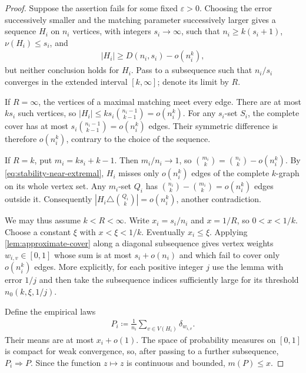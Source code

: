 \begin{proof}
Suppose the assertion fails for some fixed $\varepsilon>0$. Choosing the error successively smaller and the matching parameter successively larger gives a sequence $H_i$ on $n_i$ vertices, with integers $s_i\to\infty$, such that $n_i\ge k(s_i+1)$, $\nu(H_i)\le s_i$, and
\begin{align}
|H_i|\ge D(n_i,s_i)-o(n_i^k),
\label{eq:stability-near-extremal}
\end{align}
but neither conclusion holds for $H_i$. Pass to a subsequence such that $n_i/s_i$ converges in the extended interval $[k,\infty]$; denote its limit by $R$.

If $R=\infty$, the vertices of a maximal matching meet every edge. There are at most $ks_i$ such vertices, so $|H_i|\le ks_i\binom{n_i-1}{k-1}=o(n_i^k)$. For any $s_i$-set $S_i$, the complete cover has at most $s_i\binom{n_i-1}{k-1}=o(n_i^k)$ edges. Their symmetric difference is therefore $o(n_i^k)$, contrary to the choice of the sequence.

If $R=k$, put $m_i=ks_i+k-1$. Then $m_i/n_i\to1$, so $\binom{m_i}k=\binom{n_i}k-o(n_i^k)$. By \cref{eq:stability-near-extremal}, $H_i$ misses only $o(n_i^k)$ edges of the complete $k$-graph on its whole vertex set. Any $m_i$-set $Q_i$ has $\binom{n_i}k-\binom{m_i}k=o(n_i^k)$ edges outside it. Consequently $|H_i\triangle\binom{Q_i}k|=o(n_i^k)$, another contradiction.

We may thus assume $k<R<\infty$. Write $x_i=s_i/n_i$ and $x=1/R$, so $0<x<1/k$. Choose a constant $\xi$ with $x<\xi<1/k$. Eventually $x_i\le\xi$. Applying \cref{lem:approximate-cover} along a diagonal subsequence gives vertex weights $w_{i,v}\in[0,1]$ whose sum is at most $s_i+o(n_i)$ and which fail to cover only $o(n_i^k)$ edges. More explicitly, for each positive integer $j$ use the lemma with error $1/j$ and then take the subsequence indices sufficiently large for its threshold $n_0(k,\xi,1/j)$.

Define the empirical laws
\begin{align*}
P_i\coloneqq\frac1{n_i}\sum_{v\in V(H_i)}\delta_{w_{i,v}}.
\end{align*}
Their means are at most $x_i+o(1)$. The space of probability measures on $[0,1]$ is compact for weak convergence, so, after passing to a further subsequence, $P_i\Rightarrow P$. Since the function $z\mapsto z$ is continuous and bounded, $m(P)\le x$.


\end{proof}
